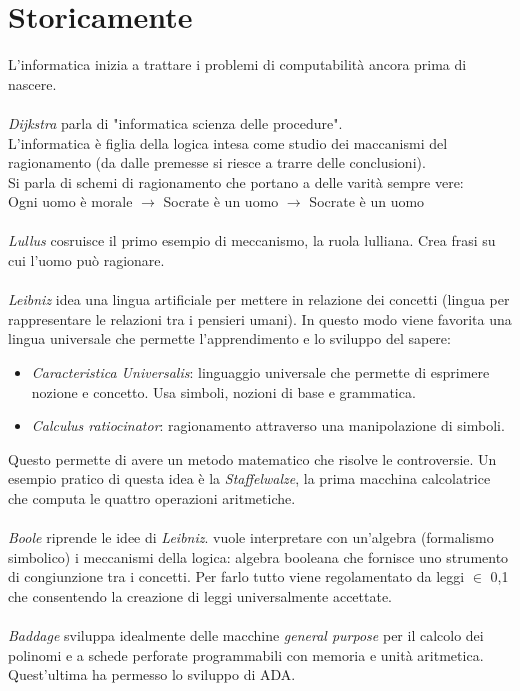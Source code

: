 \documentclass[10pt,a4paper]{book}
\begin{document}
\section{Storicamente}
L'informatica inizia a trattare i problemi di computabilit\`a ancora prima di nascere.\\\\
\noindent
\textit{Dijkstra} parla di "informatica scienza delle procedure".\\
L'informatica \`e figlia della logica intesa come studio dei maccanismi del ragionamento (da dalle premesse si riesce a trarre delle conclusioni).\\
Si parla di schemi di ragionamento che portano a delle varit\`a sempre vere:\\
Ogni uomo \`e morale $\longrightarrow$ Socrate \`e un uomo $\longrightarrow$ Socrate \`e un uomo
\\\\
\textit{Lullus} cosruisce il primo esempio di meccanismo, la ruola lulliana. Crea frasi su cui l'uomo pu\`o ragionare.
\\\\
\textit{Leibniz} idea una lingua artificiale per mettere in relazione dei concetti (lingua per rappresentare le relazioni tra i pensieri umani). In questo modo viene favorita una lingua universale che permette l'apprendimento e lo sviluppo del sapere:
\begin{itemize}
\item \textit{Caracteristica Universalis}: linguaggio universale che permette di esprimere nozione e concetto. Usa simboli, nozioni di base e grammatica.
\item \textit{Calculus ratiocinator}: ragionamento attraverso una manipolazione di simboli.
\end{itemize}
\noindent
Questo permette di avere un metodo matematico che risolve le controversie. Un esempio pratico di questa idea \`e la \textit{Staffelwalze}, la prima macchina calcolatrice che computa le quattro operazioni aritmetiche.
\\\\
\textit{Boole} riprende le idee di \textit{Leibniz}. vuole interpretare con un'algebra (formalismo simbolico) i meccanismi della logica: algebra booleana che fornisce uno strumento di congiunzione tra i concetti. Per farlo tutto viene regolamentato da leggi $\in$ {0,1} che consentendo la creazione di leggi universalmente accettate.\\\\
\textit{Baddage} sviluppa  idealmente delle macchine \textit{general purpose} per il calcolo dei polinomi e a schede perforate programmabili con memoria e unit\`a aritmetica. Quest'ultima ha permesso lo sviluppo di ADA.\\\\
\end{document}
